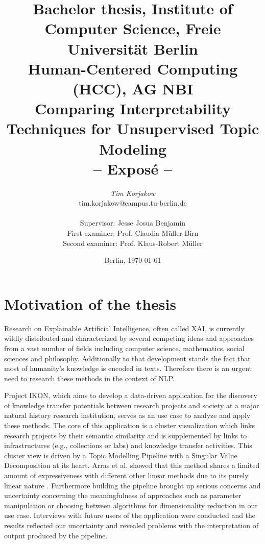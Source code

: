 \documentclass[pdftex,a4paper,12pt]{scrartcl}
\title{
{\small Bachelor thesis, Institute of Computer Science, Freie Universität Berlin}\\
{\small Human-Centered Computing (HCC), AG NBI}\\
[6ex]
{\LARGE Comparing Interpretability Techniques for Unsupervised Topic Modeling}\\
{\normalsize-- Exposé --}}
\author{
{\emph{\normalsize Tim Korjakow}}\\
{\normalsize tim.korjakow@campus.tu-berlin.de}\\\\
{\normalsize Supervisor: Jesse Josua Benjamin } \\
{\normalsize First examiner: Prof. Claudia Müller-Birn} \\
{\normalsize Second examiner: Prof. Klaus-Robert Müller } \\
}
\date{\normalsize Berlin, \today}
\newcommand{\blankpage}{
\newpage
\thispagestyle{empty}
\mbox{}
\newpage
}
\begin{document}
\maketitle 

\thispagestyle{empty}  %

\blankpage


\setcounter{page}{1} %

\section{Motivation of the thesis} 

Research on Explainable Artificial Intelligence, often called XAI, is currently wildly distributed and characterized by several competing ideas and approaches from a vast number of fields including computer science, mathematics, social sciences and philosophy. Additionally to that development stands the fact that most of humanity's knowledge is encoded in texts. Therefore there is an urgent need to research these methods in the context of NLP.

Project IKON, which aims to develop a data-driven application for the discovery of knowledge transfer potentials between research projects and society at a major natural history research institution, serves as an use case to analyze and apply these methods. The core of this application is a cluster visualization which links research projects by their semantic similarity and is supplemented by links to infrastructures (e.g., collections or labs) and knowledge transfer activities. This cluster view is driven by a Topic Modelling Pipeline with a Singular Value Decomposition at its heart. Arras et al. showed that this method shares a limited amount of expressiveness with different other linear methods due to its purely linear nature \cite{arrasWhatRelevantText2017}. Furthermore building the pipeline brought up serious concerns and uncertainty concerning the meaningfulness of approaches such as parameter manipulation or choosing between algorithms for dimensionality reduction \cite{benjaminTransparencyMediationMeaning2018} in our use case. Interviews with future users of the application were conducted and the results reflected our uncertainty and revealed problems with the interpretation of output produced by the pipeline.
\end{document}
